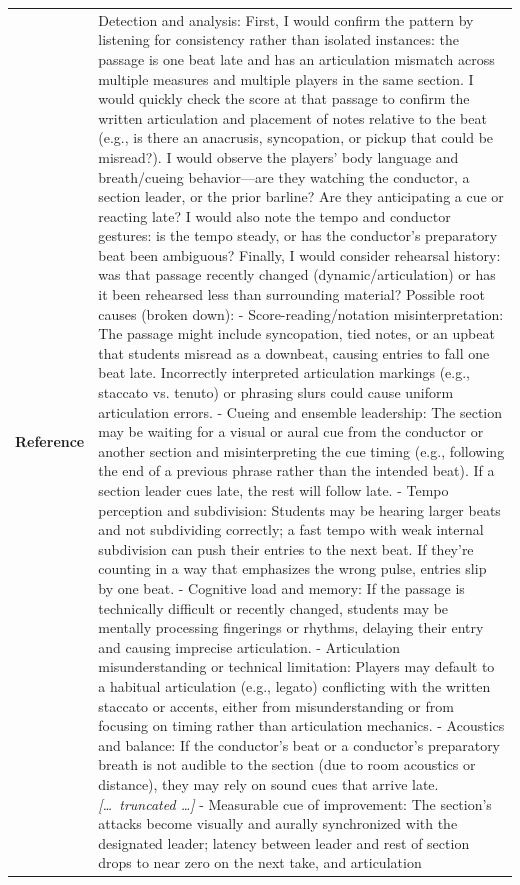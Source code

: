 \begin{longtable}{@{}l p{13cm}@{}}
  \textbf{Reference} & Detection and analysis: \newline First, I would confirm the pattern by listening for consistency rather than isolated instances: the passage is one beat late and has an articulation mismatch across multiple measures and multiple players in the same section. I would quickly check the score at that passage to confirm the written articulation and placement of notes relative to the beat (e.g., is there an anacrusis, syncopation, or pickup that could be misread?). I would observe the players' body language and breath/cueing behavior---are they watching the conductor, a section leader, or the prior barline? Are they anticipating a cue or reacting late? I would also note the tempo and conductor gestures: is the tempo steady, or has the conductor's preparatory beat been ambiguous? Finally, I would consider rehearsal history: was that passage recently changed (dynamic/articulation) or has it been rehearsed less than surrounding material? \newline Possible root causes (broken down): \newline - Score-reading/notation misinterpretation: The passage might include syncopation, tied notes, or an upbeat that students misread as a downbeat, causing entries to fall one beat late. Incorrectly interpreted articulation markings (e.g., staccato vs. tenuto) or phrasing slurs could cause uniform articulation errors. \newline - Cueing and ensemble leadership: The section may be waiting for a visual or aural cue from the conductor or another section and misinterpreting the cue timing (e.g., following the end of a previous phrase rather than the intended beat). If a section leader cues late, the rest will follow late. \newline - Tempo perception and subdivision: Students may be hearing larger beats and not subdividing correctly; a fast tempo with weak internal subdivision can push their entries to the next beat. If they're counting in a way that emphasizes the wrong pulse, entries slip by one beat. \newline - Cognitive load and memory: If the passage is technically difficult or recently changed, students may be mentally processing fingerings or rhythms, delaying their entry and causing imprecise articulation. \newline - Articulation misunderstanding or technical limitation: Players may default to a habitual articulation (e.g., legato) conflicting with the written staccato or accents, either from misunderstanding or from focusing on timing rather than articulation mechanics. \newline - Acoustics and balance: If the conductor's beat or a conductor's preparatory breath is not audible to the section (due to room acoustics or distance), they may rely on sound cues that arrive late. \newline \textit{[\ldots\ truncated \ldots]} \newline - Measurable cue of improvement: The section's attacks become visually and aurally synchronized with the designated leader; latency between leader and rest of section drops to near zero on the next take, and articulation 
\end{longtable}
